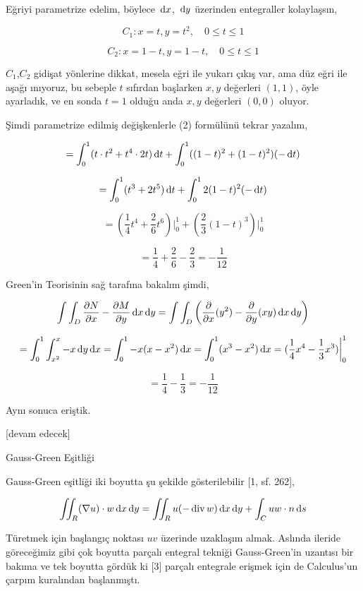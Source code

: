 \documentclass[12pt,fleqn]{article}\usepackage{../../common}
\begin{document}
Eğriyi parametrize edelim, böylece $\,\mathrm{d} x$, $\,\mathrm{d} y$ üzerinden entegraller
kolaylaşsın,

$$
C_1: x = t, y = t^2, \quad 0 \le t \le 1
$$

$$
C_2: x = 1-t, y = 1-t, \quad 0 \le t \le 1
$$

$C_1$,$C_2$ gidişat yönlerine dikkat, mesela eğri ile yukarı çıkış var, ama düz
eğri ile aşağı ınıyoruz, bu sebeple $t$ sıfırdan başlarken $x,y$ değerleri
$(1,1)$, öyle ayarladık, ve en sonda $t=1$ olduğu anda $x,y$ değerleri $(0,0)$
oluyor. 

Şimdi parametrize edilmiş değişkenlerle (2) formülünü tekrar yazalım,

$$
= \int_{0}^{1} ( t \cdot t^2 + t^4 \cdot 2t ) \,\mathrm{d} t +
\int_{0}^{1} ((1-t)^2 + (1-t)^2) (-\,\mathrm{d} t)
$$

$$
= \int_{0}^{1} (t^3 + 2t^5) \,\mathrm{d} t + \int _{0}^{1} 2 (1-t)^2 (-\,\mathrm{d} t)
$$

$$
= (\frac{1}{4} t^4 + \frac{2}{6} t^6) \big\vert_{0}^{1} +
(\frac{2}{3} (1-t)^3 ) \big\vert_{0}^{1}
$$

$$
= \frac{1}{4} + \frac{2}{6} - \frac{2}{3} = -\frac{1}{12}
$$

Green'in Teorisinin sağ tarafına bakalım şimdi, 

$$
\int \int_D \frac{\partial N}{\partial x} - \frac{\partial M}{\partial y} \,\mathrm{d} x \,\mathrm{d} y =
\int \int_D \left(
\frac{\partial }{\partial x}(y^2) - \frac{\partial }{\partial y}(xy) \,\mathrm{d} x \,\mathrm{d} y
\right)
$$

$$
= \int_{0}^{1} \int_{x^2}^{x} -x \,\mathrm{d} y \,\mathrm{d} x =
\int_{0}^{1} -x (x-x^2) \,\mathrm{d} x =
\int_{0}^{1} (x^3 - x^2) \,\mathrm{d} x = (\frac{1}{4} x^4 - \frac{1}{3} x^3 ) \bigg\vert_{0}^{1}
$$

$$
= \frac{1}{4} - \frac{1}{3} = -\frac{1}{12}
$$

Aynı sonuca eriştik.

[devam edecek]

Gauss-Green Eşitliği

Gauss-Green eşitliği iki boyutta şu şekilde gösterilebilir [1, sf. 262],

$$
\iint_R (\nabla u ) \cdot w \,\mathrm{d} x \,\mathrm{d} y =
\iint_R u (- \operatorname{div} w) \,\mathrm{d} x \,\mathrm{d} y + \int_C u w \cdot n \,\mathrm{d} s
$$

Türetmek için başlangıç noktası $uv$ üzerinde uzaklaşım almak. Aslında
ileride göreceğimiz gibi çok boyutta parçalı entegral tekniği Gauss-Green'in
uzantısı bir bakıma ve tek boyutta gördük ki [3] parçalı entegrale erişmek
için de Calculus'un çarpım kuralından başlanmıştı.
\end{document}
